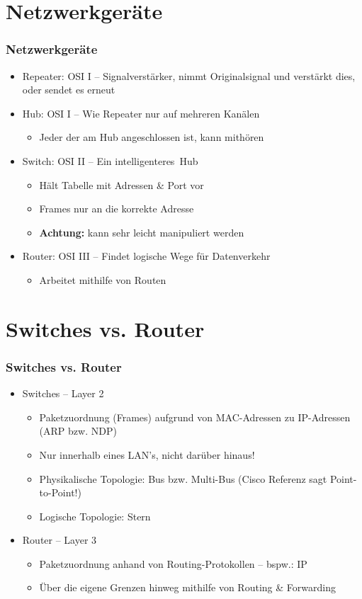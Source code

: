 \documentclass[xcolor=dvipsnames, aspectratio=169]{beamer}
\begin{document}
\section{Netzwerkgeräte}
\begin{frame}
	\frametitle{Netzwerkgeräte}
	\begin{itemize}
		\item Repeater: OSI I -- Signalverstärker, nimmt Originalsignal und verstärkt dies, oder sendet es erneut
		\item Hub: OSI I -- Wie Repeater nur auf mehreren Kanälen
		\begin{itemize}
			\item Jeder der am Hub angeschlossen ist, kann mithören
		\end{itemize}
		\item Switch: OSI II -- Ein \glqq intelligenteres\grqq\ Hub
		\begin{itemize}
			\item Hält Tabelle mit Adressen \& Port vor
			\item Frames nur an die korrekte Adresse
			\item \textbf{Achtung:} kann sehr leicht manipuliert werden
		\end{itemize}
		\item Router: OSI III -- Findet logische Wege für Datenverkehr
		\begin{itemize}
			\item Arbeitet mithilfe von Routen
		\end{itemize}
	\end{itemize}
\end{frame}

\section{Switches vs. Router}
\begin{frame}
	\frametitle{Switches vs. Router}
	\begin{itemize}
		\item Switches -- Layer 2
		\begin{itemize}
			\item Paketzuordnung (Frames) aufgrund von MAC-Adressen zu IP-Adressen (ARP bzw. NDP)
			\item Nur innerhalb eines LAN's, nicht darüber hinaus!
			\item Physikalische Topologie: Bus bzw. Multi-Bus (Cisco Referenz sagt Point-to-Point!)
			\item Logische Topologie: Stern
		\end{itemize}
		\item Router -- Layer 3
		\begin{itemize}
			\item Paketzuordnung anhand von Routing-Protokollen -- bspw.: IP
			\item Über die eigene Grenzen hinweg mithilfe von Routing \& Forwarding
		\end{itemize}
	\end{itemize}
\end{frame}
\end{document}
